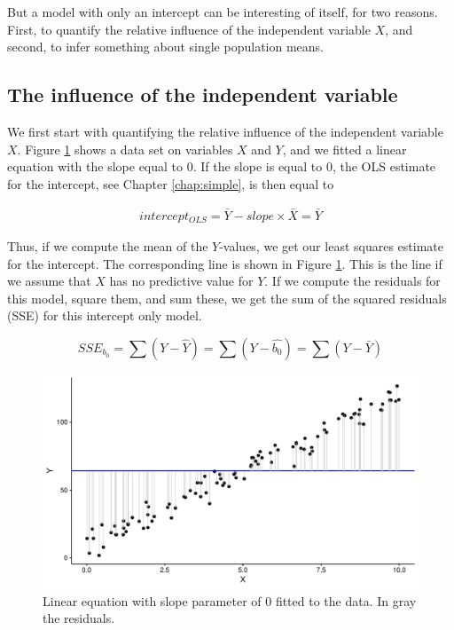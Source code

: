 \documentclass[]{book}\usepackage[]{graphicx}\usepackage[]{color}
\makeatletter
\def\maxwidth{ %
  \ifdim\Gin@nat@width>\linewidth
    \linewidth
  \else
    \Gin@nat@width
  \fi
}
\newenvironment{knitrout}{}{} %
\makeatother
\begin{document}
But a model with only an intercept can be interesting of itself, for two reasons. First, to quantify the relative influence of the independent variable $X$, and second, to infer something about single population means. 

\subsection{The influence of the independent variable}

We first start with quantifying the relative influence of the independent variable $X$. Figure \ref{fig:intercept_only} shows a data set on variables $X$ and $Y$, and we fitted a linear equation with the slope equal to 0. If the slope is equal to 0, the OLS estimate for the intercept, see Chapter \ref{chap:simple}, is then equal to 

\begin{eqnarray}
intercept_{OLS} = \bar{Y} - slope \times  \bar{X} = \bar{Y}
\end{eqnarray}

Thus, if we compute the mean of the $Y$-values, we get our least squares estimate for the intercept. The corresponding line is shown in Figure \ref{fig:intercept_only}. This is the line if we assume that $X$ has no predictive value for $Y$. If we compute the residuals for this model, square them, and sum these, we get the sum of the squared residuals (SSE) for this intercept only model. 

\begin{equation}
SSE_{b_0} = \sum (Y - \hat{Y}) = \sum (Y - \hat{b_0}) = \sum (Y - \bar{Y})
\end{equation}

\begin{knitrout}
\color{fgcolor}\begin{figure}

{\centering \includegraphics[width=\maxwidth]{figure/intercept_only-1} 

}

\caption[Linear equation with slope parameter of 0 fitted to the data]{Linear equation with slope parameter of 0 fitted to the data. In gray the residuals. }\label{fig:intercept_only}
\end{figure}


\end{knitrout}
\end{document}
